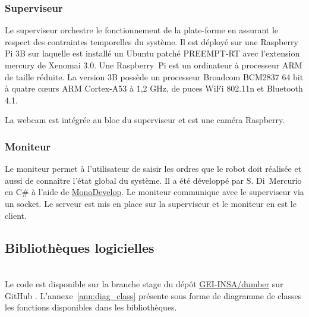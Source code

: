   \subsubsection{Superviseur}


Le superviseur orchestre le fonctionnement de la plate-forme en assurant le respect des contraintes temporelles du système. Il est déployé sur une Raspberry Pi 3B sur laquelle est installé un Ubuntu patché PREEMPT-RT avec l'extension mercury de Xenomai 3.0. Une Raspberry~Pi est un ordinateur à processeur ARM de taille réduite. La version 3B possède un processeur Broadcom BCM2837 64 bit à quatre cœurs ARM Cortex-A53 à 1,2 GHz, de puces WiFi 802.11n et Bluetooth 4.1.

La webcam est intégrée au bloc du superviseur et est une caméra Raspberry.

\subsubsection{Moniteur}

Le moniteur permet à l'utilisateur de saisir les ordres que le robot doit réalisée et aussi de connaître l'état global du système. Il a été développé par S. Di~Mercurio en C\# à l'aide de \href{https://www.monodevelop.com}{MonoDevelop}. Le moniteur communique avec le superviseur via un socket. Le serveur est mis en place sur la superviseur et le moniteur en est le client.

\subsection{Bibliothèques logicielles}


\\



Le code est disponible sur la branche stage du dépôt \href{https://github.com/INSA-GEI/dumber/tree/stable}{GEI-INSA/dumber} sur GitHub . L'annexe~\ref{ann:diag_class} présente sous forme de diagramme de classes les fonctions disponibles dans les bibliothèques.\\

